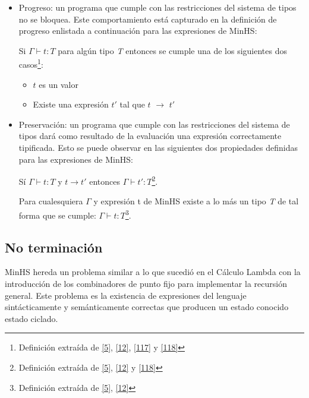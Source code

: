         \begin{itemize}
            \item Progreso: un programa que cumple con las restricciones del sistema de tipos no se bloquea. Este comportamiento está capturado en la definición de progreso enlistada a continuación para las expresiones de \textsf{MinHS}:
             
             \begin{definition}
                Si $\Gamma \vdash t : \textit{T}$ para algún tipo \textit{T} entonces se cumple una de los siguientes dos casos\footnote{Definición extraída de  \hyperlink{5}{[5]},  \hyperlink{12}{[12]}, \hyperlink{117}{[117]} y  \hyperlink{118}{[118]}}:
                \begin{itemize}
			\item $t$ es un valor 
                	\item Existe una expresión $t'$ tal que $t$ $\to$ $t'$
		   \end{itemize}
             \end{definition}

\bigskip
            \item Preservación: un programa que cumple con las restricciones del sistema de tipos dará como resultado de la evaluación una expresión correctamente tipificada. Esto se puede observar en las siguientes dos propiedades definidas para las expresiones de \textsf{MinHS}:
                                    
                     \begin{definition}
                        Sí $\Gamma \vdash t : \textit{T}$ y $t \to t'$ entonces $\Gamma \vdash t' : \textit{T}$\footnote{Definición extraída de  \hyperlink{5}{[5]},  \hyperlink{12}{[12]}  y \hyperlink{118}{[118]}}.
                    \end{definition}

                    \begin{definition}
                        Para cualesquiera $\Gamma$ y expresión t de \textsf{MinHS} existe a lo más un tipo \textit{T} de tal forma que se cumple: $\Gamma \vdash t : \textit{T}$\footnote{Definición extraída de \hyperlink{5}{[5]},  \hyperlink{12}{[12]}}.
                    \end{definition}

        \end{itemize}

    \subsection{No terminación}
        \textsf{MinHS} hereda un problema similar a lo que sucedió en el Cálculo Lambda con la introducción de los combinadores de punto fijo para implementar la recursión general. Este problema es la existencia de expresiones del lenguaje sintácticamente y semánticamente correctas que producen un estado conocido estado ciclado.

